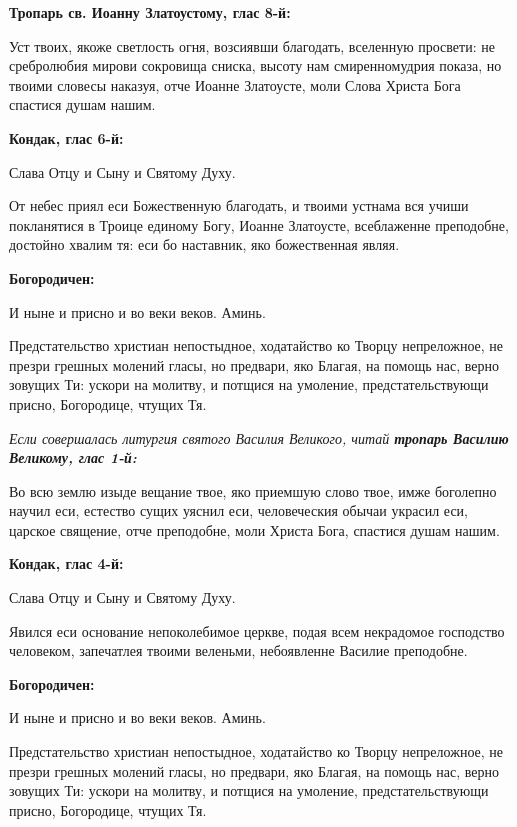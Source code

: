 \bfseries Тропарь св. Иоанну Златоустому, глас 8-й:\normalfont{}


Уст твоих, якоже светлость огня, возсиявши благодать, вселенную просвети: не сребролюбия мирови сокровища сниска, высоту нам смиренномудрия показа, но твоими словесы наказуя, отче Иоанне Златоусте, моли Слова Христа Бога спастися душам нашим.




\bfseries Кондак, глас 6-й:\normalfont{}


Слава Отцу и Сыну и Святому Духу.


От небес приял еси Божественную благодать, и твоими устнама вся учиши покланятися в Троице единому Богу, Иоанне Златоусте, всеблаженне преподобне, достойно хвалим тя: еси бо наставник, яко божественная являя.





\bfseries Богородичен:\normalfont{}


И ныне и присно и во веки веков. Аминь.


Предстательство христиан непостыдное, ходатайство ко Творцу непреложное, не презри грешных молений гласы, но предвари, яко Благая, на помощь нас, верно зовущих Ти: ускори на молитву, и потщися на умоление, предстательствующи присно, Богородице, чтущих Тя.




\itshape Если совершалась литургия святого Василия Великого, читай \bfseries тропарь Василию Великому, глас 1-й:\normalfont{}\normalfont{}


Во всю землю изыде вещание твое, яко приемшую слово твое, имже боголепно научил еси, естество сущих уяснил еси, человеческия обычаи украсил еси, царское священие, отче преподобне, моли Христа Бога, спастися душам нашим.




\bfseries Кондак, глас 4-й:\normalfont{}


Слава Отцу и Сыну и Святому Духу.


Явился еси основание непоколебимое церкве, подая всем некрадомое господство человеком, запечатлея твоими веленьми, небоявленне Василие преподобне.




\bfseries Богородичен:\normalfont{}


И ныне и присно и во веки веков. Аминь.


Предстательство христиан непостыдное, ходатайство ко Творцу непреложное, не презри грешных молений гласы, но предвари, яко Благая, на помощь нас, верно зовущих Ти: ускори на молитву, и потщися на умоление, предстательствующи присно, Богородице, чтущих Тя.




